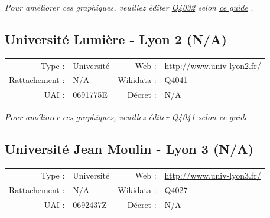 \documentclass[12pt,french,landscape]{article}
\begin{document}
\textit{\scriptsize Pour améliorer ces graphiques, veuillez éditer \href{https://www.wikidata.org/entity/Q4032}{Q4032}  selon \href{https://github.com/cpesr/wikidataESR/blob/master/Rmd/wikidataESR.md}{ce guide}}
.


\newpage

\hypertarget{universituxe9-lumiuxe8re---lyon-2-na}{%
\subsection{Université Lumière - Lyon 2
(N/A)}\label{universituxe9-lumiuxe8re---lyon-2-na}}

\begin{tabular*}{0.45\textwidth}{rp{2cm}rl}  
\hline  
Type : & Université & Web : &\href{http://www.univ-lyon2.fr/}{http://www.univ-lyon2.fr/} \\  
Rattachement : & N/A & Wikidata : & \href{https://www.wikidata.org/entity/Q4041}{Q4041} \\  
UAI : & 0691775E & Décret : & N/A \\  
\hline  
\end{tabular*}

\textit{\scriptsize Pour améliorer ces graphiques, veuillez éditer \href{https://www.wikidata.org/entity/Q4041}{Q4041}  selon \href{https://github.com/cpesr/wikidataESR/blob/master/Rmd/wikidataESR.md}{ce guide}}
.


\newpage

\hypertarget{universituxe9-jean-moulin---lyon-3-na}{%
\subsection{Université Jean Moulin - Lyon 3
(N/A)}\label{universituxe9-jean-moulin---lyon-3-na}}

\begin{tabular*}{0.45\textwidth}{rp{2cm}rl}  
\hline  
Type : & Université & Web : &\href{http://www.univ-lyon3.fr/}{http://www.univ-lyon3.fr/} \\  
Rattachement : & N/A & Wikidata : & \href{https://www.wikidata.org/entity/Q4027}{Q4027} \\  
UAI : & 0692437Z & Décret : & N/A \\  
\hline  
\end{tabular*}
\end{document}
